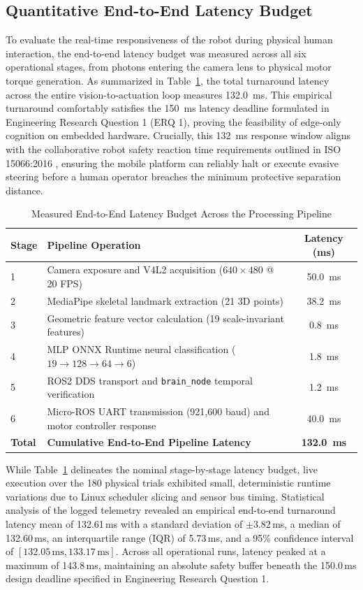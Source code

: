 \subsection{Quantitative End-to-End Latency Budget}
\label{sec:latency_budget}
To evaluate the real-time responsiveness of the robot during physical human interaction, the end-to-end latency budget was measured across all six operational stages, from photons entering the camera lens to physical motor torque generation. As summarized in Table~\ref{tab:latency_budget}, the total turnaround latency across the entire vision-to-actuation loop measures 132.0~ms. This empirical turnaround comfortably satisfies the 150~ms latency deadline formulated in Engineering Research Question 1 (ERQ 1), proving the feasibility of edge-only cognition on embedded hardware. Crucially, this 132~ms response window aligns with the collaborative robot safety reaction time requirements outlined in ISO 15066:2016 \cite{iso150662016}, ensuring the mobile platform can reliably halt or execute evasive steering before a human operator breaches the minimum protective separation distance.

\begin{table}[H]
\centering
\caption{Measured End-to-End Latency Budget Across the Processing Pipeline}
\label{tab:latency_budget}
\begin{tabular}{|l|l|c|}
\hline
\textbf{Stage} & \textbf{Pipeline Operation} & \textbf{Latency (ms)} \\
\hline
1 & Camera exposure and V4L2 acquisition ($640 \times 480$ @ 20 FPS) & 50.0~ms \\
\hline
2 & MediaPipe skeletal landmark extraction (21 3D points) & 38.2~ms \\
\hline
3 & Geometric feature vector calculation (19 scale-invariant features) & 0.8~ms \\
\hline
4 & MLP ONNX Runtime neural classification ($19 \to 128 \to 64 \to 6$) & 1.8~ms \\
\hline
5 & ROS2 DDS transport and \texttt{brain\_node} temporal verification & 1.2~ms \\
\hline
6 & Micro-ROS UART transmission (921,600 baud) and motor controller response & 40.0~ms \\
\hline
\textbf{Total} & \textbf{Cumulative End-to-End Pipeline Latency} & \textbf{132.0~ms} \\
\hline
\end{tabular}
\end{table}

While Table~\ref{tab:latency_budget} delineates the nominal stage-by-stage latency budget, live execution over the 180 physical trials exhibited small, deterministic runtime variations due to Linux scheduler slicing and sensor bus timing. Statistical analysis of the logged telemetry revealed an empirical end-to-end turnaround latency mean of 132.61\,ms with a standard deviation of $\pm 3.82$\,ms, a median of 132.60\,ms, an interquartile range (IQR) of 5.73\,ms, and a 95\% confidence interval of $[132.05\,\text{ms}, 133.17\,\text{ms}]$. Across all operational runs, latency peaked at a maximum of 143.8\,ms, maintaining an absolute safety buffer beneath the 150.0\,ms design deadline specified in Engineering Research Question 1.

